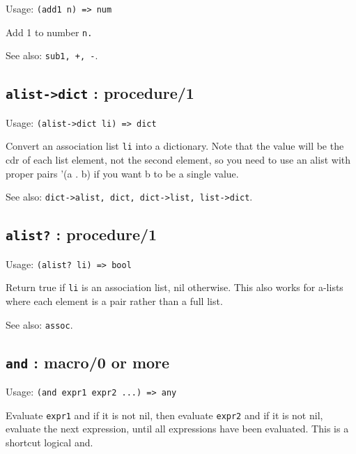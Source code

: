 \documentclass[
]{article}
\newcommand{\passthrough}[1]{#1}
\begin{document}
Usage: \passthrough{\lstinline!(add1 n) => num!}

Add 1 to number \passthrough{\lstinline!n.!}

See also: \passthrough{\lstinline!sub1, +, -!}.

\hypertarget{alist-dict-procedure1-1}{%
\subsection{\texorpdfstring{\texttt{alist-\textgreater{}dict} :
procedure/1}{alist-\textgreater dict : procedure/1}}\label{alist-dict-procedure1-1}}

Usage: \passthrough{\lstinline!(alist->dict li) => dict!}

Convert an association list \passthrough{\lstinline!li!} into a
dictionary. Note that the value will be the cdr of each list element,
not the second element, so you need to use an alist with proper pairs
'(a . b) if you want b to be a single value.

See also:
\passthrough{\lstinline!dict->alist, dict, dict->list, list->dict!}.

\hypertarget{alist-procedure1-1}{%
\subsection{\texorpdfstring{\texttt{alist?} :
procedure/1}{alist? : procedure/1}}\label{alist-procedure1-1}}

Usage: \passthrough{\lstinline!(alist? li) => bool!}

Return true if \passthrough{\lstinline!li!} is an association list, nil
otherwise. This also works for a-lists where each element is a pair
rather than a full list.

See also: \passthrough{\lstinline!assoc!}.

\hypertarget{and-macro0-or-more-1}{%
\subsection{\texorpdfstring{\texttt{and} : macro/0 or
more}{and : macro/0 or more}}\label{and-macro0-or-more-1}}

Usage: \passthrough{\lstinline!(and expr1 expr2 ...) => any!}

Evaluate \passthrough{\lstinline!expr1!} and if it is not nil, then
evaluate \passthrough{\lstinline!expr2!} and if it is not nil, evaluate
the next expression, until all expressions have been evaluated. This is
a shortcut logical and.
\end{document}
